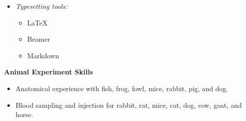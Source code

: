 \begin{multicols}{3}
\begin{itemize}
    \item \textit{Typesetting tools:}  
    \begin{itemize}  
        \item \LaTeX
        \item Beamer
        \item Markdown
    \end{itemize} 
\end{itemize}  
  
\end{multicols} %
\vspace{-1em}

\textbf{Animal Experiment Skills}

\begin{itemize}
    \item Anatomical experience with fish, frog, fowl, mice, rabbit, pig, and dog.
    \item Blood sampling and injection for rabbit, rat, mice, cat, dog, cow, goat, and horse.
\end{itemize}



